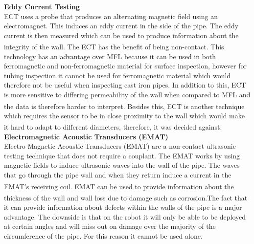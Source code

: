 \documentclass[11pt]{article}		%
\newcommand{\supercite}[1]{\textsuperscript{\cite{#1}}}		%
\begin{document}
	        
	        \textbf{Eddy Current Testing}
	        \\
	       ECT uses a probe that produces an alternating magnetic field using an electromagnet. This induces an eddy current in the side of the pipe. The eddy current is then measured which can be used to produce information about the integrity of the wall.\supercite{ECT} The ECT has the benefit of being non-contact.\supercite{Corrosion} This technology has an advantage over MFL because it can be used in both ferromagnetic and non-ferromagnetic material for surface inspection, however for tubing inspection it cannot be used for ferromagnetic material which would therefore not be useful when inspecting cast iron pipes. In addition to this, ECT is more sensitive to differing permeability of the wall when compared to MFL and the data is therefore harder to interpret.\supercite{MFL_explanation} Besides this, ECT is another technique which requires the sensor to be in close proximity to the wall which would make it hard to adapt to different diameters, therefore, it was decided against.\supercite{ECT}
	        \\
	        \textbf{Electromagnetic Acoustic Transducers (EMAT)}
	        \\
	        Electro Magnetic Acoustic Transducers (EMAT) are a non-contact ultrasonic testing technique that does not require a couplant. The EMAT works by using magnetic fields to induce ultrasonic waves into the wall of the pipe. The waves that go through the pipe wall and when they return induce a current in the EMAT’s receiving coil.\supercite{EMAT} EMAT can be used to provide information about the thickness of the wall and wall loss due to damage such as corrosion.\supercite{EMAT}The fact that it can provide information about defects within the walls of the pipe is a major advantage. The downside is that on the robot it will only be able to be deployed at certain angles and will miss out on damage over the majority of the circumference of the pipe. For this reason it cannot be used alone.
\end{document}
